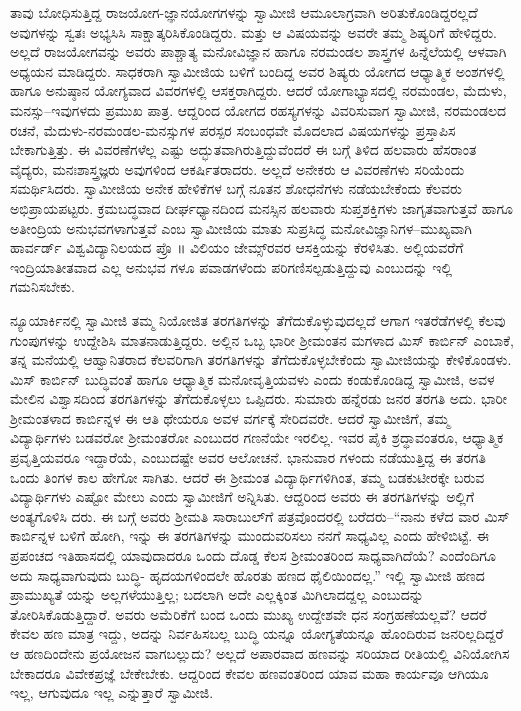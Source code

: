 ತಾವು ಬೋಧಿಸುತ್ತಿದ್ದ ರಾಜಯೋಗ-ಜ್ಞಾನಯೋಗಗಳನ್ನು ಸ್ವಾಮೀಜಿ ಆಮೂಲಾಗ್ರವಾಗಿ ಅರಿತುಕೊಂಡಿದ್ದರಲ್ಲದೆ ಅವುಗಳನ್ನು ಸ್ವತಃ ಅಭ್ಯಸಿಸಿ ಸಾಕ್ಷಾತ್ಕರಿಸಿಕೊಂಡಿದ್ದರು. ಮತ್ತು ಆ ವಿಷಯವನ್ನು ಅವರೇ ತಮ್ಮ ಶಿಷ್ಯರಿಗೆ ಹೇಳಿದ್ದರು. ಅಲ್ಲದೆ ರಾಜಯೋಗವನ್ನು ಅವರು ಪಾಶ್ಚಾತ್ಯ ಮನೋವಿಜ್ಞಾನ ಹಾಗೂ ನರಮಂಡಲ ಶಾಸ್ತ್ರಗಳ ಹಿನ್ನೆಲೆಯಲ್ಲಿ ಆಳವಾಗಿ ಅಧ್ಯಯನ ಮಾಡಿದ್ದರು. ಸಾಧಕರಾಗಿ ಸ್ವಾಮೀಜಿಯ ಬಳಿಗೆ ಬಂದಿದ್ದ ಅವರ ಶಿಷ್ಯರು ಯೋಗದ ಆಧ್ಯಾತ್ಮಿಕ ಅಂಶಗಳಲ್ಲಿ ಹಾಗೂ ಅನುಷ್ಠಾನ ಯೋಗ್ಯವಾದ ವಿವರಗಳಲ್ಲಿ ಆಸಕ್ತರಾಗಿದ್ದರು. ಆದರೆ ಯೋಗಾಭ್ಯಾಸದಲ್ಲಿ ನರಮಂಡಲ, ಮೆದುಳು, ಮನಸ್ಸು–ಇವುಗಳದು ಪ್ರಮುಖ ಪಾತ್ರ. ಆದ್ದರಿಂದ ಯೋಗದ ರಹಸ್ಯಗಳನ್ನು ವಿವರಿಸುವಾಗ ಸ್ವಾಮೀಜಿ, ನರಮಂಡಲದ ರಚನೆ, ಮೆದುಳು-ನರಮಂಡಲ-ಮನಸ್ಸುಗಳ ಪರಸ್ಪರ ಸಂಬಂಧವೇ ಮೊದಲಾದ ವಿಷಯಗಳನ್ನು ಪ್ರಸ್ತಾಪಿಸ ಬೇಕಾಗುತ್ತಿತ್ತು. ಈ ವಿವರಣೆಗಳೆಲ್ಲ ಎಷ್ಟು ಅದ್ಭುತವಾಗಿರುತ್ತಿದ್ದುವೆಂದರೆ ಈ ಬಗ್ಗೆ ತಿಳಿದ ಹಲವಾರು ಹೆಸರಾಂತ ವೈದ್ಯರು, ಮನಃಶಾಸ್ತ್ರಜ್ಞರು ಅವುಗಳಿಂದ ಆಕರ್ಷಿತರಾದರು. ಅಲ್ಲದೆ ಅನೇಕರು ಆ ವಿವರಣೆಗಳು ಸರಿಯೆಂದು ಸಮರ್ಥಿಸಿದರು. ಸ್ವಾಮೀಜಿಯ ಅನೇಕ ಹೇಳಿಕೆಗಳ ಬಗ್ಗೆ ನೂತನ ಶೋಧನೆಗಳು ನಡೆಯಬೇಕೆಂದು ಕೆಲವರು ಅಭಿಪ್ರಾಯಪಟ್ಟರು. ಕ್ರಮಬದ್ಧವಾದ ದೀರ್ಘಧ್ಯಾನದಿಂದ ಮನಸ್ಸಿನ ಹಲವಾರು ಸುಪ್ತಶಕ್ತಿಗಳು ಜಾಗೃತವಾಗುತ್ತವೆ ಹಾಗೂ ಅತೀಂದ್ರಿಯ ಅನುಭವಗಳಾಗುತ್ತವೆ ಎಂಬ ಸ್ವಾಮೀಜಿಯ ಮಾತು ಸುಪ್ರಸಿದ್ಧ ಮನೋವಿಜ್ಞಾನಿಗಳ–ಮುಖ್ಯವಾಗಿ ಹಾರ್ವರ್ಡ್ ವಿಶ್ವವಿದ್ಯಾನಿಲಯದ ಪ್ರೊ ॥ ವಿಲಿಯಂ ಜೇಮ್ಸ್​ರವರ ಆಸಕ್ತಿಯನ್ನು ಕೆರಳಿಸಿತು. ಅಲ್ಲಿಯವರೆಗೆ ಇಂದ್ರಿಯಾತೀತವಾದ ಎಲ್ಲ ಅನುಭವ ಗಳೂ ಪವಾಡಗಳೆಂದು ಪರಿಗಣಿಸಲ್ಪಡುತ್ತಿದ್ದುವು ಎಂಬುದನ್ನು ಇಲ್ಲಿ ಗಮನಿಸಬೇಕು.

ನ್ಯೂಯಾರ್ಕಿನಲ್ಲಿ ಸ್ವಾಮೀಜಿ ತಮ್ಮ ನಿಯೋಜಿತ ತರಗತಿಗಳನ್ನು ತೆಗೆದುಕೊಳ್ಳುವುದಲ್ಲದೆ ಆಗಾಗ ಇತರೆಡೆಗಳಲ್ಲಿ ಕೆಲವು ಗುಂಪುಗಳನ್ನು ಉದ್ದೇಶಿಸಿ ಮಾತನಾಡುತ್ತಿದ್ದರು. ಅಲ್ಲಿನ ಒಬ್ಬ ಭಾರೀ ಶ್ರೀಮಂತನ ಮಗಳಾದ ಮಿಸ್ ಕಾರ್ಬಿನ್ ಎಂಬಾಕೆ, ತನ್ನ ಮನೆಯಲ್ಲಿ ಆಹ್ವಾನಿತರಾದ ಕೆಲವರಿಗಾಗಿ ತರಗತಿಗಳನ್ನು ತೆಗೆದುಕೊಳ್ಳಬೇಕೆಂದು ಸ್ವಾಮೀಜಿಯನ್ನು ಕೇಳಿಕೊಂಡಳು. ಮಿಸ್ ಕಾರ್ಬಿನ್ ಬುದ್ಧಿವಂತೆ ಹಾಗೂ ಆಧ್ಯಾತ್ಮಿಕ ಮನೋವೃತ್ತಿಯವಳು ಎಂದು ಕಂಡುಕೊಂಡಿದ್ದ ಸ್ವಾಮೀಜಿ, ಅವಳ ಮೇಲಿನ ವಿಶ್ವಾಸದಿಂದ ತರಗತಿಗಳನ್ನು ತೆಗೆದುಕೊಳ್ಳಲು ಒಪ್ಪಿದರು. ಸುಮಾರು ಹನ್ನೆರಡು ಜನರ ತರಗತಿ ಅದು. ಭಾರೀ ಶ್ರೀಮಂತಳಾದ ಕಾರ್ಬಿನ್ನಳ ಈ ಆತಿ ಥೇಯರೂ ಅವಳ ವರ್ಗಕ್ಕೆ ಸೇರಿದವರೇ. ಆದರೆ ಸ್ವಾಮೀಜಿಗೆ, ತಮ್ಮ ವಿದ್ಯಾರ್ಥಿಗಳು ಬಡವರೋ ಶ್ರೀಮಂತರೋ ಎಂಬುದರ ಗಣನೆಯೇ ಇರಲಿಲ್ಲ. ಇವರ ಪೈಕಿ ಶ್ರದ್ಧಾವಂತರೂ, ಆಧ್ಯಾತ್ಮಿಕ ಪ್ರವೃತ್ತಿಯವರೂ ಇದ್ದಾರೆಯೆ, ಎಂಬುದಷ್ಟೇ ಅವರ ಆಲೋಚನೆ. ಭಾನುವಾರ ಗಳಂದು ನಡೆಯುತ್ತಿದ್ದ ಈ ತರಗತಿ ಒಂದು ತಿಂಗಳ ಕಾಲ ಹೇಗೋ ಸಾಗಿತು. ಆದರೆ ಈ ಶ್ರೀಮಂತ ವಿದ್ಯಾರ್ಥಿಗಳಿಗಿಂತ, ತಮ್ಮ ಬಡಕುಟೀರಕ್ಕೇ ಬರುವ ವಿದ್ಯಾರ್ಥಿಗಳು ಎಷ್ಟೋ ಮೇಲು ಎಂದು ಸ್ವಾಮೀಜಿಗೆ ಅನ್ನಿಸಿತು. ಆದ್ದರಿಂದ ಅವರು ಈ ತರಗತಿಗಳನ್ನು ಅಲ್ಲಿಗೆ ಅಂತ್ಯಗೊಳಿಸಿ ದರು. ಈ ಬಗ್ಗೆ ಅವರು ಶ್ರೀಮತಿ ಸಾರಾಬುಲ್​ಗೆ ಪತ್ರವೊಂದರಲ್ಲಿ ಬರೆದರು–“ನಾನು ಕಳೆದ ವಾರ ಮಿಸ್ ಕಾರ್ಬಿನ್ನಳ ಬಳಿಗೆ ಹೋಗಿ, ಇನ್ನು ಈ ತರಗತಿಗಳನ್ನು ಮುಂದುವರಿಸಲು ನನಗೆ ಸಾಧ್ಯವಿಲ್ಲ ಎಂದು ಹೇಳಿಬಿಟ್ಟೆ. ಈ ಪ್ರಪಂಚದ ಇತಿಹಾಸದಲ್ಲಿ ಯಾವುದಾದರೂ ಒಂದು ದೊಡ್ಡ ಕೆಲಸ ಶ್ರೀಮಂತರಿಂದ ಸಾಧ್ಯವಾಗಿದೆಯೆ? ಎಂದೆಂದಿಗೂ ಅದು ಸಾಧ್ಯವಾಗುವುದು ಬುದ್ಧಿ- ಹೃದಯಗಳಿಂದಲೇ ಹೊರತು ಹಣದ ಥೈಲಿಯಿಂದಲ್ಲ.” ಇಲ್ಲಿ ಸ್ವಾಮೀಜಿ ಹಣದ ಪ್ರಾಮುಖ್ಯತೆ ಯನ್ನು ಅಲ್ಲಗಳೆಯುತ್ತಿಲ್ಲ; ಬದಲಾಗಿ ಅದೇ ಎಲ್ಲಕ್ಕಿಂತ ಮಿಗಿಲಾದದ್ದಲ್ಲ ಎಂಬುದನ್ನು ತೋರಿಸಿಕೊಡುತ್ತಿದ್ದಾರೆ. ಅವರು ಅಮೆರಿಕೆಗೆ ಬಂದ ಒಂದು ಮುಖ್ಯ ಉದ್ದೇಶವೇ ಧನ ಸಂಗ್ರಹಣೆಯಲ್ಲವೆ? ಆದರೆ ಕೇವಲ ಹಣ ಮಾತ್ರ ಇದ್ದು, ಅದನ್ನು ನಿರ್ವಹಿಸಬಲ್ಲ ಬುದ್ಧಿ ಯನ್ನೂ ಯೋಗ್ಯತೆಯನ್ನೂ ಹೊಂದಿರುವ ಜನರಿಲ್ಲದಿದ್ದರೆ ಆ ಹಣದಿಂದೇನು ಪ್ರಯೋಜನ ವಾಗಬಲ್ಲುದು? ಅಲ್ಲದೆ ಅಪಾರವಾದ ಹಣವನ್ನು ಸರಿಯಾದ ರೀತಿಯಲ್ಲಿ ವಿನಿಯೋಗಿಸ ಬೇಕಾದರೂ ವಿವೇಕಪ್ರಜ್ಞೆ ಬೇಕೇಬೇಕು. ಆದ್ದರಿಂದ ಕೇವಲ ಹಣವಂತರಿಂದ ಯಾವ ಮಹಾ ಕಾರ್ಯವೂ ಆಗಿಯೂ ಇಲ್ಲ, ಆಗುವುದೂ ಇಲ್ಲ ಎನ್ನುತ್ತಾರೆ ಸ್ವಾಮೀಜಿ.

